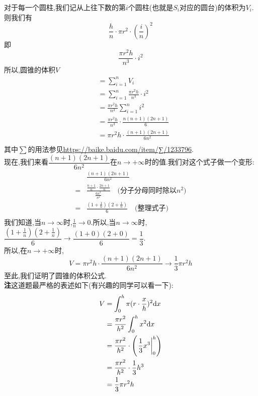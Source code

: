 \documentclass[UTF8]{ctexart}
\begin{document}
\begin{itemize}
\hspace*{2em}对于每一个圆柱,我们记从上往下数的第$i$个圆柱(也就是$S_i$对应的圆台)的体积为$V_i$.则我们有
\[\frac{h}{n}\cdot \pi r^2\cdot (\dfrac{i}{n})^2\]
即
\[\frac{\pi r^2 h}{n^3}\cdot i^2\]
\hspace*{2em}所以,圆锥的体积$V$
\begin{align*}
&=\sum\limits_{i=1}^{n} V_i\\
&=\sum\limits_{i=1}^{n} \frac{\pi r^2h}{n^3}\cdot i^2\\
&=\frac{\pi r^2h}{n^3} \sum\limits_{i=1}^{n}i^2\\
&=\frac{\pi r^2h}{n^3}\cdot \frac{n(n+1)(2n+1)}{6}\\
&=\pi r^2h\cdot \frac{(n+1)(2n+1)}{6n^2}\\
\end{align*}
\hspace*{2em}其中$\sum$的用法参见\uline{https://baike.baidu.com/item/∑/1233796}.\\
\hspace*{2em}现在,我们来看$\dfrac{(n+1)(2n+1)}{6n^2}$在$n\to+\infty$时的值.我们对这个式子做一个变形:
\begin{align*}
&\frac{(n+1)(2n+1)}{6n^2}\\
=&\frac{\frac{n+1}{n}\cdot\frac{2n+1}{n}}{\frac{6n^2}{n^2}}\quad\text{(分子分母同时除以$n^2$)}\\
=&\frac{(1+\frac{1}{n})(2+\frac{1}{n})}{6}\quad\text{(整理式子)}\\
\end{align*}
我们知道,当$n\to \infty$时,$\frac{1}{n}\to 0$.所以,当$n\to\infty$时,$\dfrac{(1+\frac{1}{n})(2+\frac{1}{n})}{6}\to\dfrac{(1+0)(2+0)}{6}=\dfrac{1}{3}$.\\
\hspace*{2em}所以,在$n\to+\infty$时,
\[V=\pi r^2h\cdot \frac{(n+1)(2n+1)}{6n^2}\to\frac{1}{3}\pi r^2h\]
\hspace*{2em}至此,我们证明了圆锥的体积公式.\\
\hspace*{2em}\textbf{注}\quad 这道题最严格的表述如下(有兴趣的同学可以看一下):
\begin{align*}
V&=\int_0^h \pi(r\cdot\frac{x}{h})^2{\rm d}x\\
&=\frac{\pi r^2}{h^2}\int_0^h x^2{\rm d}x\\
&=\frac{\pi r^2}{h^2}\cdot\left(\left.\frac{1}{3}x^3\right|_0^h\right)\\
&=\frac{\pi r^2}{h^2}\cdot \frac{1}{3}h^3\\
&=\frac{1}{3}\pi r^2h
\end{align*}

\end{itemize}
\end{document}
